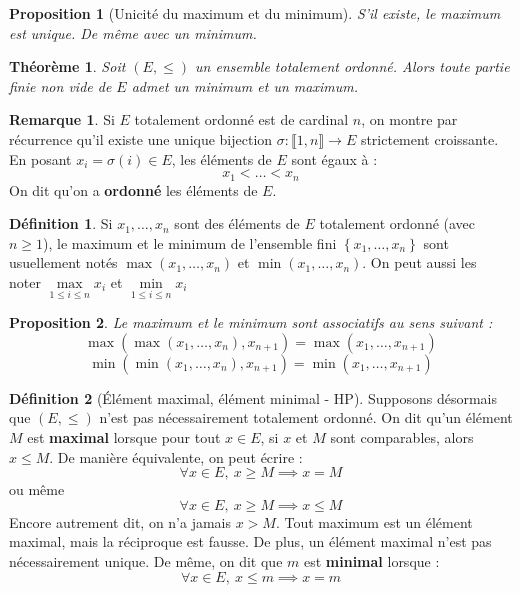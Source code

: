 \documentclass[french]{book}
\theoremstyle{plain}
\newtheorem{thm}{Théorème}[chapter]
\newtheorem{prop}{Proposition}[chapter]
\theoremstyle{definition}
\newtheorem{dfn}{Définition}[chapter]
\newtheorem{rmq}{Remarque}[chapter]
\theoremstyle{remark}
\begin{document}
\begin{prop}[Unicité du maximum et du minimum]
	S'il existe, le maximum est unique. De même avec un minimum.
\end{prop}
\begin{thm}
	Soit $(E,\leqslant)$ un ensemble totalement ordonné. Alors toute partie finie non vide de $E$ admet un minimum et un maximum.
\end{thm}
\begin{rmq}
	Si $E$ totalement ordonné est de cardinal $n$, on montre par récurrence qu'il existe une unique bijection $\sigma:\llbracket1,n\rrbracket\rightarrow E$ strictement croissante. En posant $x_i=\sigma(i)\in E$, les éléments de $E$ sont égaux à : $$x_1<\ldots<x_n$$ On dit qu'on a \textbf{ordonné} les éléments de $E$.
\end{rmq}
\begin{dfn}
	Si $x_1,\ldots,x_n$ sont des éléments de $E$ totalement ordonné (avec $n\geqslant1$), le maximum et le minimum de l'ensemble fini $\left\{x_1,\ldots,x_n\right\}$ sont usuellement notés $\max(x_1,\ldots,x_n)$ et $\min(x_1,\ldots,x_n)$. On peut aussi les noter $\displaystyle \underset{1\leqslant i\leqslant n}{\max} x_i$ et $\displaystyle \underset{1\leqslant i\leqslant n}{\min} x_i$
\end{dfn}
\begin{prop}
	Le maximum et le minimum sont associatifs au sens suivant : $$\max\left(\max(x_1,\ldots,x_n), x_{n+1}\right)=\max(x_1,\ldots,x_{n+1})$$
	$$\min\left(\min(x_1,\ldots,x_n), x_{n+1}\right)=\min(x_1,\ldots,x_{n+1})$$
\end{prop}
\begin{dfn}[Élément maximal, élément minimal - HP]
	Supposons désormais que $(E,\leqslant)$ n'est pas nécessairement totalement ordonné. On dit qu'un élément $M$ est \textbf{maximal} lorsque pour tout $x\in E$, si $x$ et $M$ sont comparables, alors $x\leqslant M$. De manière équivalente, on peut écrire : $$\forall x\in E,\ x\geqslant M \implies x=M$$ ou même $$\forall x\in E,\ x\geqslant M \implies x\leqslant M$$ Encore autrement dit, on n'a jamais $x>M$. Tout maximum est un élément maximal, mais la réciproque est fausse. De plus, un élément maximal n'est pas nécessairement unique. De même, on dit que $m$ est \textbf{minimal} lorsque : $$\forall x\in E,\ x\leqslant m\implies x=m$$
\end{dfn}
\end{document}
